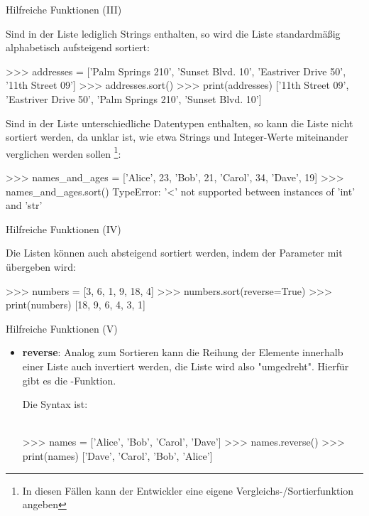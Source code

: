          \begin{frame}[fragile]{Hilfreiche Funktionen (III)}
            
            Sind in der Liste lediglich Strings enthalten, so wird die Liste standardmäßig alphabetisch aufsteigend sortiert:

\begin{pyconcode}
>>> addresses = ['Palm Springs 210', 'Sunset Blvd. 10', 'Eastriver Drive 50', '11th Street 09']
>>> addresses.sort()
>>> print(addresses)
['11th Street 09', 'Eastriver Drive 50', 'Palm Springs 210', 'Sunset Blvd. 10']
\end{pyconcode} 

             Sind in der Liste unterschiedliche Datentypen enthalten, so kann die Liste nicht sortiert werden, da unklar ist, wie etwa Strings und Integer-Werte miteinander verglichen werden sollen \footnote{In diesen Fällen kann der Entwickler eine eigene Vergleichs-/Sortierfunktion angeben}:

\begin{pyconcode}
>>> names_and_ages = ['Alice', 23, 'Bob', 21, 'Carol', 34, 'Dave', 19]
>>> names_and_ages.sort()
TypeError: '<' not supported between instances of 'int' and 'str'
\end{pyconcode} 

         \end{frame}
         
         
         \begin{frame}[fragile]{Hilfreiche Funktionen (IV)}
            
            Die Listen können auch absteigend sortiert werden, indem der Parameter  mit übergeben wird:
            
\begin{pyconcode}
>>> numbers = [3, 6, 1, 9, 18, 4]
>>> numbers.sort(reverse=True)
>>> print(numbers)
[18, 9, 6, 4, 3, 1]
\end{pyconcode} 

         \end{frame}
         
         
         \begin{frame}[fragile]{Hilfreiche Funktionen (V)}
            \begin{itemize}
                \item \textbf{reverse}: Analog zum Sortieren kann die Reihung der Elemente innerhalb einer Liste auch invertiert werden, die Liste wird also "umgedreht". Hierfür gibt es die -Funktion.
                
                Die Syntax ist: \\~\
                

\begin{pyconcode}
>>> names = ['Alice', 'Bob', 'Carol', 'Dave']
>>> names.reverse()
>>> print(names)
['Dave', 'Carol', 'Bob', 'Alice']
\end{pyconcode} 

            \end{itemize}
            
        \end{frame}
        
